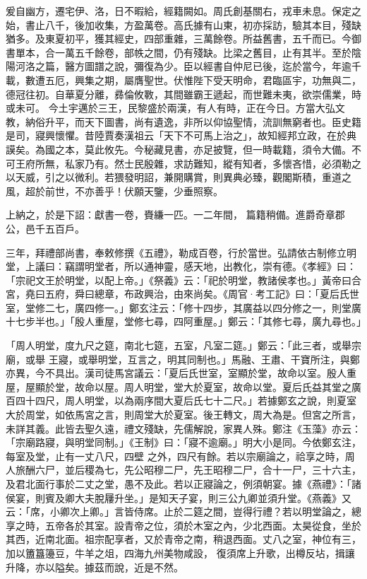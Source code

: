 \begin{pinyinscope}
 爰自幽方，遷宅伊、洛，日不暇給，經籍闕如。周氏創基關右，戎車未息。保定之始，書止八千，後加收集，方盈萬卷。高氏據有山東，初亦採訪，驗其本目，殘缺猶多。及東夏初平，獲其經史，四部重雜，三萬餘卷。所益舊書，五千而已。今御書單本，合一萬五千餘卷，部帙之間，仍有殘缺。比梁之舊目，止有其半。至於陰陽河洛之篇，醫方圖譜之說，彌復為少。臣以經書自仲尼已後，迄於當今，年逾千載，數遭五厄，興集之期，屬膺聖世。伏惟陛下受天明命，君臨區宇，功無與二，德冠往初。自華夏分離，彞倫攸斁，其間雖霸王遞起，而世難未夷，欲崇儒業，時或未可。
 今土宇邁於三王，民黎盛於兩漢，有人有時，正在今日。方當大弘文教，納俗升平，而天下圖書，尚有遺逸，非所以仰協聖情，流訓無窮者也。臣史籍是司，寢興懷懼。昔陸賈奏漢祖云「天下不可馬上治之」，故知經邦立政，在於典謨矣。為國之本，莫此攸先。今秘藏見書，亦足披覽，但一時載籍，須令大備。不可王府所無，私家乃有。然士民殷雜，求訪難知，縱有知者，多懷吝惜，必須勒之以天威，引之以微利。若猥發明詔，兼開購賞，則異典必臻，觀閣斯積，重道之風，超於前世，不亦善乎！伏願天鑒，少垂照察。



 上納之，於是下詔：獻書一卷，賚縑一匹。一二年間，
 篇籍稍備。進爵奇章郡公，邑千五百戶。



 三年，拜禮部尚書，奉敕修撰《五禮》，勒成百卷，行於當世。弘請依古制修立明堂，上議曰：竊謂明堂者，所以通神靈，感天地，出教化，崇有德。《孝經》曰：「宗祀文王於明堂，以配上帝。」《祭義》云：「祀於明堂，教諸侯孝也。」黃帝曰合宮，堯曰五府，舜曰總章，布政興治，由來尚矣。《周官·考工記》曰：「夏后氏世室，堂修二七，廣四修一。」鄭玄注云：「修十四步，其廣益以四分修之一，則堂廣十七步半也。」「殷人重屋，堂修七尋，四阿重屋。」鄭云：「其修七尋，廣九尋也。」



 「周人明堂，度九尺之筵，南北七筵，五室，凡室二筵。」鄭云：「此三者，或舉宗廟，或舉
 王寢，或舉明堂，互言之，明其同制也。」馬融、王肅、干寶所注，與鄭亦異，今不具出。漢司徒馬宮議云：「夏后氏世室，室顯於堂，故命以室。殷人重屋，屋顯於堂，故命以屋。周人明堂，堂大於夏室，故命以堂。夏后氏益其堂之廣百四十四尺，周人明堂，以為兩序間大夏后氏七十二尺。」若據鄭玄之說，則夏室大於周堂，如依馬宮之言，則周堂大於夏室。後王轉文，周大為是。但宮之所言，未詳其義。此皆去聖久遠，禮文殘缺，先儒解說，家異人殊。鄭注《玉藻》亦云：「宗廟路寢，與明堂同制。」《王制》曰：「寢不逾廟。」明大小是同。今依鄭玄注，每室及堂，止有一丈八尺，四壁
 之外，四尺有餘。若以宗廟論之，祫享之時，周人旅酬六尸，並后稷為七，先公昭穆二尸，先王昭穆二尸，合十一尸，三十六主，及君北面行事於二丈之堂，愚不及此。若以正寢論之，例須朝宴。據《燕禮》：「諸侯宴，則賓及卿大夫脫屨升坐。」是知天子宴，則三公九卿並須升堂。《燕義》又云：「席，小卿次上卿。」言皆侍席。止於二筵之間，豈得行禮？若以明堂論之，總享之時，五帝各於其室。設青帝之位，須於木室之內，少北西面。太昊從食，坐於其西，近南北面。祖宗配享者，又於青帝之南，稍退西面。丈八之室，神位有三，加以簠簋籩豆，牛羊之俎，四海九州美物咸設，
 復須席上升歌，出樽反坫，揖讓升降，亦以隘矣。據茲而說，近是不然。




\end{pinyinscope}
